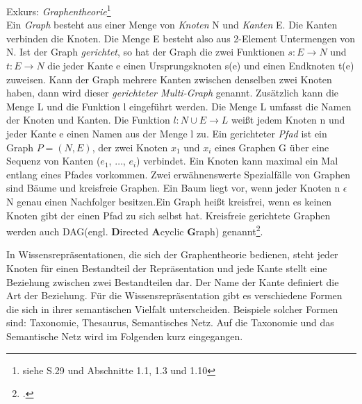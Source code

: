Exkurs: \textit{Graphentheorie}\footnote{siehe \cite{STU09} S.29 und \cite{DIE20} Abschnitte 1.1, 1.3 und 1.10}\\
Ein \textit{Graph} besteht aus einer Menge von \textit{Knoten} N und \textit{Kanten} E. Die Kanten verbinden die Knoten. Die Menge E besteht also aus 2-Element Untermengen von N. Ist der Graph \textit{gerichtet}, so hat der Graph die zwei Funktionen $s:E\rightarrow N$ und $t:E\rightarrow N$ die jeder Kante e einen Ursprungsknoten s(e) und einen Endknoten t(e) zuweisen. Kann der Graph mehrere Kanten zwischen denselben zwei Knoten haben, dann wird dieser \textit{gerichteter Multi-Graph} genannt. Zusätzlich kann die Menge L und die Funktion l eingeführt werden. Die Menge L umfasst die Namen der Knoten und Kanten. Die Funktion $l:N\cup E\rightarrow L$ weißt jedem Knoten n und jeder Kante e einen Namen aus der Menge l zu.
Ein gerichteter \textit{Pfad} ist ein Graph $P = (N, E)$, der zwei Knoten $x_1$ und $x_i$ eines Graphen G über eine Sequenz von Kanten ($e_1$, $\dots$, $e_i$) verbindet. Ein Knoten kann maximal ein Mal entlang eines Pfades vorkommen. 
Zwei erwähnenswerte Spezialfälle von Graphen sind Bäume und kreisfreie Graphen. Ein Baum liegt vor, wenn jeder Knoten n $\epsilon$ N genau einen Nachfolger besitzen.\glqq Ein Graph heißt kreisfrei, wenn es keinen Knoten gibt der einen Pfad zu sich selbst hat. Kreisfreie gerichtete Graphen werden auch DAG(engl. \textbf{D}irected \textbf{A}cyclic \textbf{G}raph) genannt\grqq\footcite{STU09}. 

In Wissensrepräsentationen, die sich der Graphentheorie bedienen, steht jeder Knoten für einen Bestandteil der Repräsentation und jede Kante stellt eine Beziehung zwischen zwei Bestandteilen dar. Der Name der Kante definiert die Art der Beziehung. Für die Wissensrepräsentation gibt es verschiedene Formen die sich in ihrer semantischen Vielfalt unterscheiden. Beispiele solcher Formen sind: Taxonomie, Thesaurus, Semantisches Netz. Auf die Taxonomie und das Semantische Netz wird im Folgenden kurz eingegangen.
 
